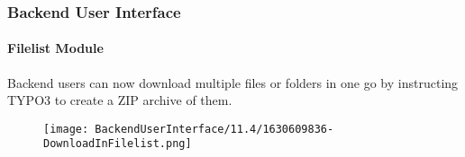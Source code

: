 %

\begin{frame}[fragile]
	\frametitle{Backend User Interface}
	\framesubtitle{Filelist Module}

	Backend users can now download multiple files or folders in one go by
	instructing TYPO3 to create a ZIP archive of them.

	\begin{figure}
		\texttt{[image: BackendUserInterface/11.4/1630609836-DownloadInFilelist.png]}
	\end{figure}

\end{frame}

